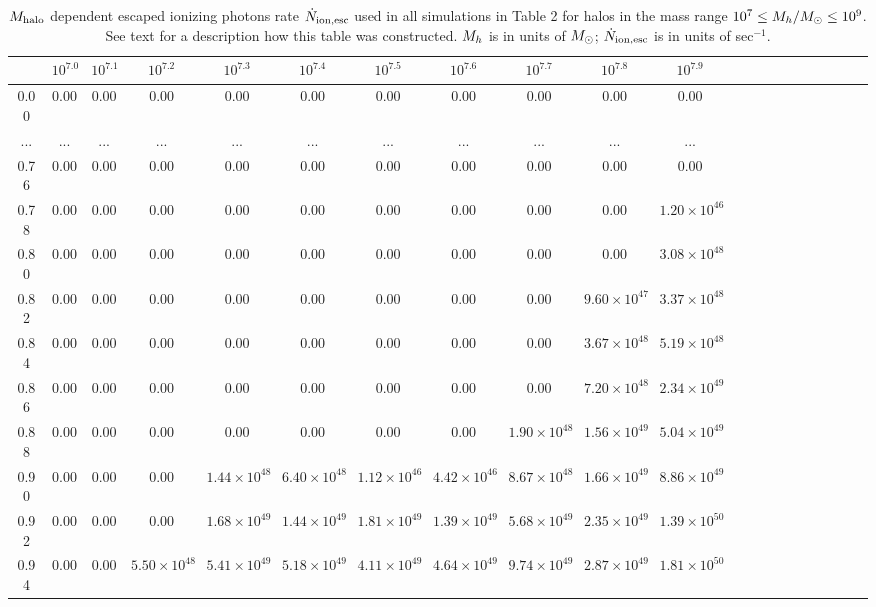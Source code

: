 \begin{table*}
\centering
\caption{$M_{\rm halo}$ dependent escaped ionizing photons rate $\dot{N}_{\rm ion,esc}$ used in all simulations in Table 2 for halos in the mass range  $10^7 \leq \mh/\Ms \leq 10^9$. See text for a description how this table was constructed. $M_h$ is in units of $\Ms$; $\dot{N}_{\rm ion,esc}$ is in units of sec$^{-1}$.}
\label{tab_hao} 
\begin{tabular}{ccccccccccccccccccccc}
\hline\hline
& $10^{7.0}$  & $10^{7.1}$  & $10^{7.2}$  & $10^{7.3}$  & $10^{7.4}$  & $10^{7.5}$  & $10^{7.6}$  & $10^{7.7}$  & $10^{7.8}$  & $10^{7.9}$  \\
\hline
0.00  &0.00 &0.00 &0.00 &0.00 &0.00 &0.00 &0.00 &0.00 &0.00 &0.00 \\
\hline
...
&... &... &... &... &... &... &... &... &... &... \\
\hline
0.76  &0.00 &0.00 &0.00 &0.00 &0.00 &0.00 &0.00 &0.00 &0.00 &0.00 \\
\hline
0.78  &0.00 &0.00 &0.00 &0.00 &0.00 &0.00 &0.00 &0.00 &0.00 &$1.20\times 10^{46}$ \\
\hline
0.80  &0.00 &0.00 &0.00 &0.00 &0.00 &0.00 &0.00 &0.00 &0.00 &$3.08\times 10^{48}$ \\
\hline
0.82  &0.00 &0.00 &0.00 &0.00 &0.00 &0.00 &0.00 &0.00 &$9.60\times 10^{47}$ &$3.37\times 10^{48}$ \\
\hline
0.84  &0.00 &0.00 &0.00 &0.00 &0.00 &0.00 &0.00 &0.00 &$3.67\times 10^{48}$ &$5.19\times 10^{48}$ \\
\hline
0.86  &0.00 &0.00 &0.00 &0.00 &0.00 &0.00 &0.00 &0.00 &$7.20\times 10^{48}$ &$2.34\times 10^{49}$ \\
\hline
0.88  &0.00 &0.00 &0.00 &0.00 &0.00 &0.00 &0.00 &$1.90\times 10^{48}$ &$1.56\times 10^{49}$ &$5.04\times 10^{49}$ \\
\hline
0.90  &0.00 &0.00 &0.00 &$1.44\times 10^{48}$ &$6.40\times 10^{48}$ &$1.12\times 10^{46}$ &$4.42\times 10^{46}$ &$8.67\times 10^{48}$ &$1.66\times 10^{49}$ &$8.86\times 10^{49}$ \\
\hline
0.92  &0.00 &0.00 &0.00 &$1.68\times 10^{49}$ &$1.44\times 10^{49}$ &$1.81\times 10^{49}$ &$1.39\times 10^{49}$ &$5.68\times 10^{49}$ &$2.35\times 10^{49}$ &$1.39\times 10^{50}$ \\
\hline
0.94  &0.00 &0.00 &$5.50\times 10^{48}$ &$5.41\times 10^{49}$ &$5.18\times 10^{49}$ &$4.11\times 10^{49}$ &$4.64\times 10^{49}$ &$9.74\times 10^{49}$ &$2.87\times 10^{49}$ &$1.81\times 10^{50}$ \\

\end{tabular}
\end{table*}
